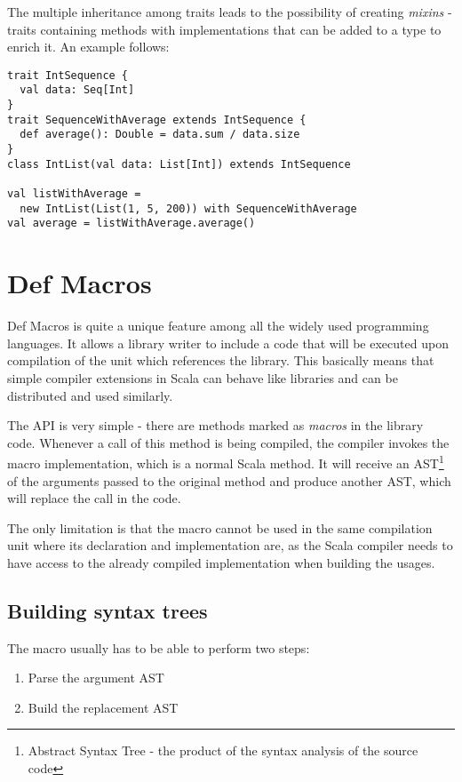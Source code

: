 The multiple inheritance among traits leads to the possibility of creating \textit{mixins} - traits containing methods with implementations that can be added to a type to enrich it. An example follows:

\lstset{style=Scala}
\begin{lstlisting}
trait IntSequence {
  val data: Seq[Int]
}
trait SequenceWithAverage extends IntSequence {
  def average(): Double = data.sum / data.size
}
class IntList(val data: List[Int]) extends IntSequence

val listWithAverage = 
  new IntList(List(1, 5, 200)) with SequenceWithAverage
val average = listWithAverage.average()
\end{lstlisting}

\section{Def Macros}
\label{sec:defmacros}

Def Macros is quite a unique feature among all the widely used programming languages. It allows a library writer to include a code that will be executed upon compilation of the unit which references the library. This basically means that simple compiler extensions in Scala can behave like libraries and can be distributed and used similarly.

The API is very simple - there are methods marked as \textit{macros} in the library code. Whenever a call of this method is being compiled, the compiler invokes the macro implementation, which is a normal Scala method. It will receive an AST\footnote{Abstract Syntax Tree - the product of the syntax analysis of the source code} of the arguments passed to the original method and produce another AST, which will replace the call in the code.


The only limitation is that the macro cannot be used in the same compilation unit where its declaration and implementation are, as the Scala compiler needs to have access to the already compiled implementation when building the usages.

\subsection{Building syntax trees}
\label{subsec:buildingast}

The macro usually has to be able to perform two steps:

\begin{enumerate}
	\item Parse the argument AST
	\item Build the replacement AST
\end{enumerate}

